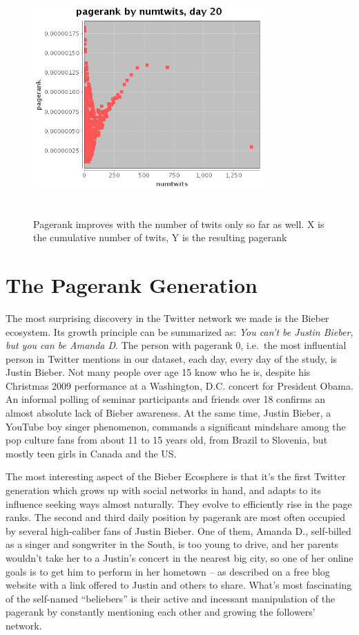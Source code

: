 \documentclass[10pt,oneside]{memoir}
\begin{document}
\begin{figure}
\begin{center}
\includegraphics[height=3.5in,width=3.5in]{figures/points-ctwits-prank-20}
\caption{Pagerank improves with the number of twits only so far as well.  X is the cumulative number of twits, Y is the resulting pagerank} 
\label{figure:ctwits-prank}
\end{center}
\end{figure}
\pagebreak \section{The Pagerank Generation}
\label{thepagerankgeneration}

The most surprising discovery in the Twitter network we made is the Bieber ecosystem.  Its growth principle can be summarized as: {\itshape You can't be Justin Bieber, but you can be Amanda D}.  The person with pagerank 0, i.e.\ the most influential person in Twitter mentions in our dataset, each day, every day of the study, is Justin Bieber.  Not many people over age 15 know who he is, despite his Christmas 2009 performance at a Washington, D.C. concert for President Obama.  An informal polling of seminar participants and friends over 18 confirms an almost absolute lack of Bieber awareness.  At the same time, Justin Bieber, a YouTube boy singer phenomenon, commands a significant mindshare among the pop culture fans from about 11 to 15 years old, from Brazil to Slovenia, but mostly teen girls in Canada and the US.  


The most interesting aspect of the Bieber Ecosphere is that it's the first Twitter generation which grows up with social networks in hand, and adapts to its influence seeking ways almost naturally.  They evolve to efficiently rise in the page ranks.  The second and third daily position by pagerank are most often occupied by several high-caliber fans of Justin Bieber.  One of them, Amanda D., self-billed as a singer and songwriter in the South, is too young to drive, and her parents wouldn't take her to a Justin's concert in the nearest big city, so one of her online goals is to get him to perform in her hometown -- as described on a free blog website with a link offered to Justin and others to share.  What's most fascinating of the self-named ``beliebers'' is their active and incessant manipulation of the pagerank by constantly mentioning each other and growing the followers' network.
\end{document}
